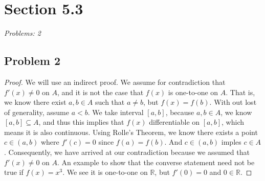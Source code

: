 \documentclass[12pt]{article}
\begin{document}
\vspace*{1cm}


\section*{Section 5.3}
\textit{Problems: 2}
\subsection*{Problem 2}
\begin{proof}
We will use an indirect proof. 
We assume for contradiction that $f'(x) \ne 0$ on $A$, and it is not the case that $f(x)$ is one-to-one on $A$. 
That is, we know there exist $a, b \in A$ such that $a \ne b$, but $f(x) = f(b)$. 
With out lost of generality, assume $a < b$. 
We take interval $[a,b]$, because $a, b \in A$, we know $[a,b] \subseteq A$, and thus this implies that $f(x)$ differentiable on $[a,b]$, which means it is also continuous. 
Using Rolle's Theorem, we know there exists a point $c \in (a,b)$ where $f'(c) = 0$ since $f(a) = f(b)$. 
And $c \in (a,b)$ imples $c \in A$.
Consequently, we have arrived at our contradiction because we assumed that $f'(x) \ne 0$ on $A$. 
An example to show that the converse statement need not be true if $f(x) = x^3$.
We see it is one-to-one on $\mathbb{R}$, but $f'(0) = 0$ and $0 \in \mathbb{R}$. 
\end{proof}
\end{document}
